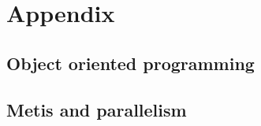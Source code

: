 \section{Appendix}
\label{sec:appendix}

\subsection{Object oriented programming}

\subsection{Metis and parallelism}